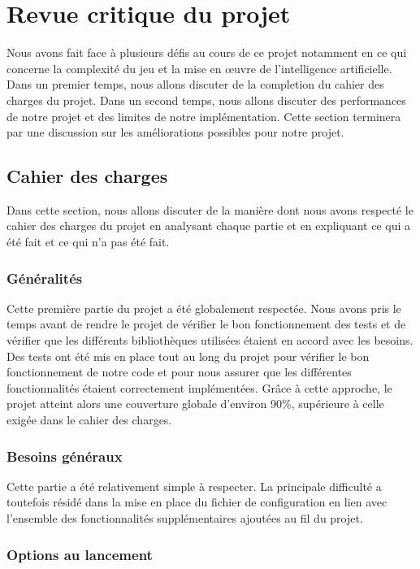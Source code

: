 \documentclass[11pt]{article}
\begin{document}
\section{Revue critique du projet}

Nous avons fait face à plusieurs défis au cours de ce projet notamment en ce qui concerne la complexité du jeu et la mise en œuvre de l’intelligence artificielle.
Dans un premier temps, nous allons discuter de la completion du cahier des charges du projet.
Dans un second temps, nous allons discuter des performances de notre projet et des limites de notre implémentation.
Cette section terminera par une discussion sur les améliorations possibles pour notre projet.


\subsection{Cahier des charges}

Dans cette section, nous allons discuter de la manière dont nous avons respecté le cahier des charges du projet en analysant chaque partie et en expliquant ce qui a été fait et ce qui n'a pas été fait.

\subsubsection{Généralités}

Cette première partie du projet a été globalement respectée. Nous avons pris le temps avant de rendre le projet de vérifier le bon fonctionnement des tests et de vérifier que les différents bibliothèques utilisées étaient en accord avec les besoins.
Des tests ont été mis en place tout au long du projet pour vérifier le bon fonctionnement de notre code et pour nous assurer que les différentes fonctionnalités étaient correctement implémentées.
Grâce à cette approche, le projet atteint alors une couverture globale d'environ 90\%, supérieure à celle exigée dans le cahier des charges.


\subsubsection{Besoins généraux}

Cette partie a été relativement simple à respecter.
La principale difficulté a toutefois résidé dans la mise en place du fichier de configuration en lien avec l’ensemble des fonctionnalités supplémentaires ajoutées au fil du projet.

\subsubsection{Options au lancement}
\end{document}

